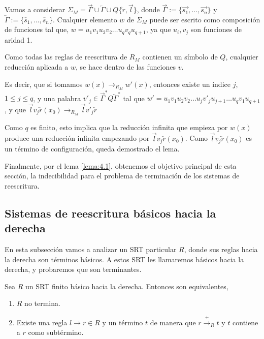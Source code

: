 \begin{demo}
  Vamos a considerar
  $\Sigma_M = \overrightarrow{\Gamma} \cup \overleftarrow{\Gamma} \cup
  Q \{ \overleftarrow{r} , \overrightarrow{l} \} $, donde
  $\overrightarrow{\Gamma} := \{\overrightarrow{s_1}, \dots,
  \overrightarrow{s_n} \}$ y
  $\overleftarrow{\Gamma} := \{ \overleftarrow{s_1}, \dots,
  \overleftarrow{s_n} \}$. Cualquier elemento $w$ de $\Sigma_M$ puede
  ser escrito como composición de funciones tal que,
  $w = u_1 v_1 u_2 v_2 \dots u_q v_q u_{q+1}$, ya que $u_i, v_j$ son
  funciones de aridad 1.

  Como todas las reglas de reescritura de $R_M$ contienen un símbolo
  de $Q$, cualquier reducción aplicada a $w$, se hace dentro de las
  funciones $v$.

  Es decir, que si tomamos $w(x) \rightarrow_{R_M} w'(x)$, entonces
  existe un índice $j$, $1 \leq j \leq q$, y una palabra
  $v'_j \in \overrightarrow{\Gamma}^{*} Q \overleftarrow{\Gamma}^{*}$
  tal que
  $w'= u_1 v_1 u_2 v_2 \dots u_j v'_j u_{j+1} \dots u_q v_1 u_{q+1}$,
  y que
  $\overrightarrow{l} v_j \overleftarrow{r} (x_0) \rightarrow_{R_M}
  \overrightarrow{l} v'_j \overleftarrow{r}$
  
  Como $q$ es finito, esto implica que la reducción infinita que
  empieza por $w(x)$ produce una reducción infinita empezando por
  $\overrightarrow{l} v_j \overleftarrow{r} (x_0)$. Como
  $\overrightarrow{l} v_j \overleftarrow{r} (x_0)$ es un término de
  configuración, queda demostrado el lema.
\end{demo}

Finalmente, por el lema \ref{lema:4.1}, obtenemos el objetivo principal
de esta sección, la indecibilidad para el problema de terminación de
los sistemas de reescritura.


\subsection{Sistemas de reescritura básicos hacia la derecha}

En esta subsección vamos a analizar un SRT particular $R$, donde sus
reglas hacia la derecha son términos básicos. A estos SRT les
llamaremos básicos hacia la derecha, y probaremos que son terminantes.

\begin{lema} \label{globfin}
  Sea $R$ un SRT finito básico hacia la derecha. Entonces son
  equivalentes,
  \begin{enumerate}
  \item $R$ no termina.
  \item Existe una regla $l \rightarrow r \in R$ y un término $t$ de
    manera que $r \xrightarrow{+}_R t$ y $t$ contiene a $r$ como
    subtérmino.
  \end{enumerate}
\end{lema}

